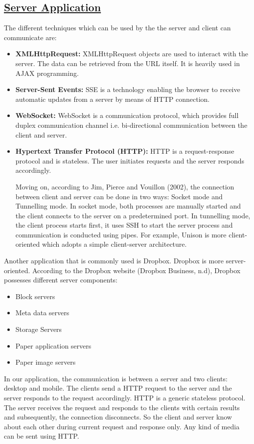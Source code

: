 \documentclass{article}
\begin{document}
\subsection{\underline{Server Application}}
The different techniques which can be used by the the server and client can communicate are:
\begin{itemize}
\item \textbf{XMLHttpRequest:} XMLHttpRequest objects are used to interact with the server. The data can be retrieved from the URL itself. It is heavily used in AJAX programming.
\item \textbf{Server-Sent Events:} SSE is a technology enabling the browser to receive automatic updates from a server by means of HTTP connection.
\item \textbf{WebSocket:} WebSocket is a communication protocol, which provides full duplex communication channel i.e. bi-directional communication between the client and server.
\item \textbf{Hypertext Transfer Protocol (HTTP):} HTTP is a request-response protocol and is stateless. The user initiates requests and the server responds accordingly.

Moving on, according to Jim, Pierce and Vouillon (2002), the connection between client and server can be done in two ways: Socket mode and Tunnelling mode. In socket mode, both processes are manually started and the client connects to the server on a predetermined port. In tunnelling mode, the client process starts first, it uses SSH to start the server process and communication is conducted using pipes. For example, Unison is more client-oriented which adopts a simple client-server architecture.
\end{itemize}

Another application that is commonly used is Dropbox. Dropbox is more server-oriented. According to the Dropbox website (Dropbox Business, n.d), Dropbox possesses different server components:
\begin{itemize}
\item Block servers
\item Meta data servers
\item Storage Servers
\item Paper application servers
\item Paper image servers
\end{itemize}

In our application, the communication is between a server and two clients: desktop and mobile. The clients send a HTTP request to the server and the server responds to the request accordingly. HTTP is a generic stateless protocol. The server receives the request and responds to the clients with certain results and subsequently, the connection disconnects. So the client and server know about each other during current request and response only. Any kind of media can be sent using HTTP.
\end{document}
